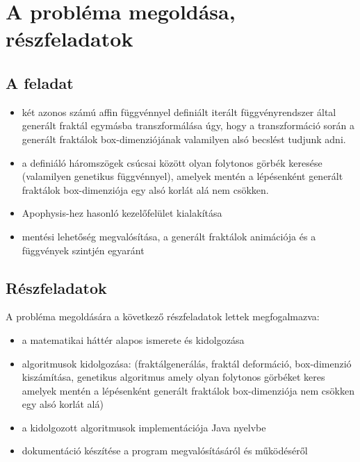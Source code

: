 \chapter{A probléma megoldása, részfeladatok}

\section{A feladat}

\begin{itemize}
  \item{két azonos számú affin függvénnyel definiált iterált függvényrendszer által generált fraktál egymásba transzformálása úgy, hogy a transzformáció során a generált fraktálok box-dimenziójának valamilyen alsó becslést tudjunk adni.}
  \item{a definiáló háromszögek csúcsai között olyan folytonos görbék keresése (valamilyen genetikus függvénnyel), amelyek mentén a lépésenként generált fraktálok box-dimenziója egy alsó korlát alá nem csökken.}
  \item{Apophysis-hez hasonló kezelőfelület kialakítása}
  \item{mentési lehetőség megvalósítása, a generált fraktálok animációja és a függvények szintjén egyaránt}
\end{itemize}

\section{Részfeladatok}
A probléma megoldására a következő részfeladatok lettek megfogalmazva:

\begin{itemize}
	\item {a matematikai háttér alapos ismerete és kidolgozása}
	\item {algoritmusok kidolgozása: (fraktálgenerálás, fraktál deformáció, box-dimenzió kiszámítása, genetikus algoritmus amely olyan folytonos görbéket keres amelyek mentén a lépésenként generált fraktálok box-dimenziója nem csökken egy alsó korlát alá)}
	\item {a kidolgozott algoritmusok implementációja Java nyelvbe}
	\item {dokumentáció készítése a program megvalósításáról és működéséről}
\end{itemize}

